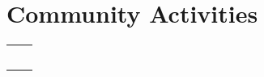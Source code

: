 \documentclass[a4paper, 10pt]{article}
\newcommand{\ExternalLink}{%
	\tikz[x=1.2ex, y=1.2ex, baseline=-0.05ex]{%
		\begin{scope}[x=1ex, y=1ex]
			\clip (-0.1,-0.1) 
			--++ (-0, 1.2) 
			--++ (0.6, 0) 
			--++ (0, -0.6) 
			--++ (0.6, 0) 
			--++ (0, -1);
			\path[draw, 
			line width = 0.5, 
			rounded corners=0.5] 
			(0,0) rectangle (1,1);
		\end{scope}
		\path[draw, line width = 0.5] (0.5, 0.5) 
		-- (1, 1);
		\path[draw, line width = 0.5] (0.6, 1) 
		-- (1, 1) -- (1, 0.6);
	}
}
\begin{document}
\begin{center}
\begin{table}[H]
\begin{adjustwidth}{-.6mm}{-0.5cm}
\begin{tabular}
		\end{tabular}
	\end{adjustwidth}
\end{table}

\vspace{-4ex}
\begin{minipage}[t]{0.48\textwidth}
	

	\vspace{-2ex}
	\section{Community Activities}
	\begin{tabularx}{1\linewidth}{>{\raggedleft\scshape}p{3cm}X}
			\multicolumn{2}{L{250pt}}{{{2015 - Present : Geneva Debate Club \textsuperscript{\href{https://www.clubdedebat.ch/}{\ExternalLink}}}}}\\
			\multicolumn{2}{L{250pt}}{{{2018 - Present : CERN Entrepreneurship Meetups \textsuperscript{\href{https://www.clubdedebat.ch/}{\ExternalLink}}}}}\\
			\multicolumn{2}{L{250pt}}{{{2016 - 2018 \hspace{12pt}: Swiss Cyber-Security meetup \textsuperscript{\href{https://swiss-cybersecurity.ch/}{\ExternalLink}}}}}\\\\
			\multicolumn{2}{L{536pt}}{{{{\large\textbf{\uuline{References:}}} Prof. John Ellis \textsuperscript{\href{https://en.wikipedia.org/wiki/John_Ellis_(physicist)}{\ExternalLink}}, Dr. Markus Nordberg \textsuperscript{\href{https://nordberg.web.cern.ch/}{\ExternalLink}}, Dr. Fran\c{c}ois Grey \textsuperscript{\href{https://en.wikipedia.org/wiki/John_Ellis_(physicist)}{\ExternalLink}}, Dr. Ben Segal \textsuperscript{\href{https://internethalloffame.org/inductees/ben-segal}{\ExternalLink}}
			
		}}}\\
	\end{tabularx}
	
\end{minipage} %
\hfill
\begin{minipage}[t]{0.48\textwidth} 
	\vspace{0pt} %
	

\end{minipage}
\end{center}
\end{document}
